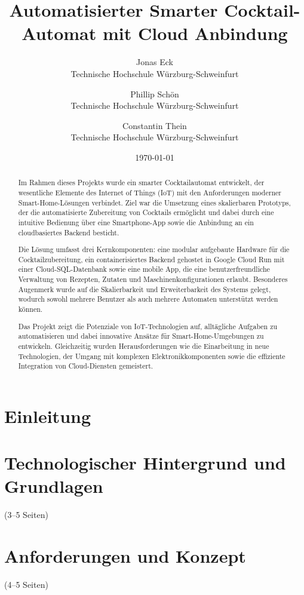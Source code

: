 \documentclass[a4paper, 12pt]{article} %
\title{Automatisierter Smarter Cocktail-Automat mit Cloud Anbindung}
\author{ 
  Jonas Eck \\
	Technische Hochschule Würzburg-Schweinfurt\\
	\and 
	Phillip Schön \\
	Technische Hochschule Würzburg-Schweinfurt\\
	\and 
  Constantin Thein\\
	Technische Hochschule Würzburg-Schweinfurt\\
	}
\date{\today}
\begin{document}
\maketitle
\newpage
\tableofcontents
\newpage

\begin{abstract}
Im Rahmen dieses Projekts wurde ein smarter Cocktailautomat entwickelt, der wesentliche Elemente des
Internet of Things (IoT) mit den Anforderungen moderner Smart-Home-Lösungen verbindet. Ziel war die
Umsetzung eines skalierbaren Prototyps, der die automatisierte Zubereitung von Cocktails ermöglicht 
und dabei durch eine intuitive Bedienung über eine Smartphone-App sowie die Anbindung an ein 
cloudbasiertes Backend besticht.

Die Lösung umfasst drei Kernkomponenten: eine modular aufgebaute Hardware für die 
Cocktailzubereitung, ein containerisiertes Backend gehostet in Google Cloud Run mit einer 
Cloud-SQL-Datenbank sowie eine mobile App, die eine benutzerfreundliche Verwaltung von Rezepten, 
Zutaten und Maschinenkonfigurationen erlaubt. Besonderes Augenmerk wurde auf die Skalierbarkeit und 
Erweiterbarkeit des Systems gelegt, wodurch sowohl mehrere Benutzer als auch mehrere Automaten 
unterstützt werden können.

Das Projekt zeigt die Potenziale von IoT-Technologien auf, alltägliche Aufgaben zu automatisieren 
und dabei innovative Ansätze für Smart-Home-Umgebungen zu entwickeln. Gleichzeitig wurden 
Herausforderungen wie die Einarbeitung in neue Technologien, der Umgang mit komplexen 
Elektronikkomponenten sowie die effiziente Integration von Cloud-Diensten gemeistert.
\end{abstract}
\newpage

\section{Einleitung}
    
\newpage

\section{Technologischer Hintergrund und Grundlagen}(3–5 Seiten)
    
\newpage

\section{Anforderungen und Konzept}(4–5 Seiten)
    
\newpage
\end{document}
